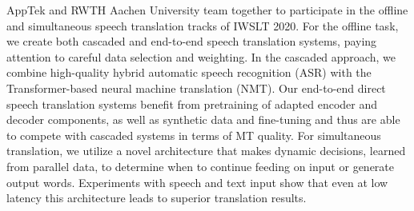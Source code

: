 AppTek and RWTH Aachen University team together to participate in the offline and simultaneous speech translation tracks of IWSLT 2020. For the offline task, we create both cascaded and end-to-end speech translation systems, paying attention to careful data selection and weighting. In the cascaded approach, we combine high-quality hybrid automatic speech recognition (ASR) with the Transformer-based neural machine translation (NMT). Our end-to-end direct speech translation systems benefit from pretraining of adapted encoder and decoder components, as well as synthetic data and fine-tuning and thus are able to compete with cascaded systems in terms of MT quality. For simultaneous translation, we utilize a novel architecture that makes dynamic decisions, learned from parallel data, to determine when to continue feeding on input or generate output words. Experiments with speech and text input show that even at low latency this architecture leads to superior translation results.
